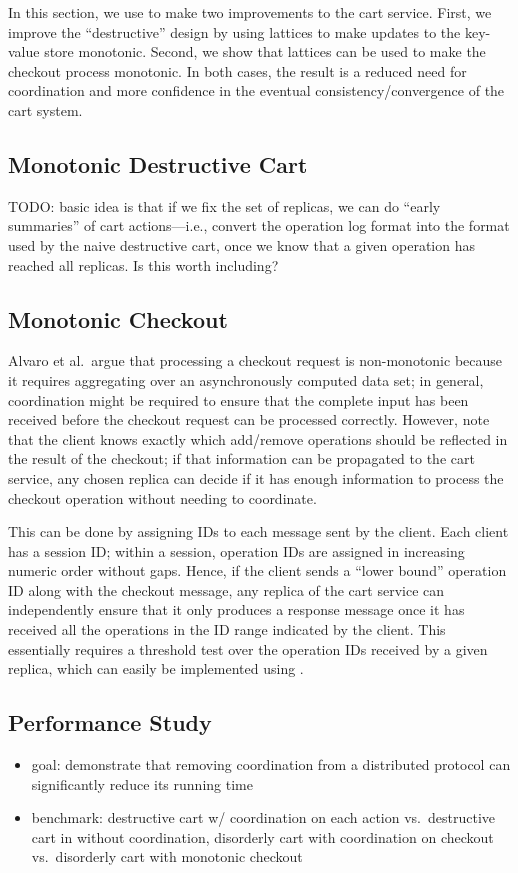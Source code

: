 In this section, we use \lang to make two improvements to the cart
service. First, we improve the ``destructive'' design by using lattices to make
updates to the key-value store monotonic. Second, we show that lattices can be
used to make the checkout process monotonic. In both cases, the result is a
reduced need for coordination and more confidence in the eventual
consistency/convergence of the cart system.

\subsection{Monotonic Destructive Cart}
TODO: basic idea is that if we fix the set of replicas, we can do ``early
summaries'' of cart actions---i.e., convert the operation log format into the
format used by the naive destructive cart, once we know that a given operation
has reached all replicas. Is this worth including?

\subsection{Monotonic Checkout}
Alvaro et al.\ argue that processing a checkout request is non-monotonic because
it requires aggregating over an asynchronously computed data set; in general,
coordination might be required to ensure that the complete input has been
received before the checkout request can be processed correctly. However, note
that the client knows exactly which add/remove operations should be reflected in
the result of the checkout; if that information can be propagated to the cart
service, any chosen replica can decide if it has enough information to process
the checkout operation without needing to coordinate.

This can be done by assigning IDs to each message sent by the client. Each
client has a session ID; within a session, operation IDs are assigned in
increasing numeric order without gaps. Hence, if the client sends a ``lower
bound'' operation ID along with the checkout message, any replica of the cart
service can independently ensure that it only produces a response message once
it has received all the operations in the ID range indicated by the client. This
essentially requires a threshold test over the operation IDs received by a given
replica, which can easily be implemented using \lang.


\subsection{Performance Study}
\begin{itemize}
\item
  goal: demonstrate that removing coordination from a distributed protocol can
  significantly reduce its running time
\item
  benchmark: destructive cart w/ coordination on each action vs.\ destructive
  cart in \lang without coordination, disorderly cart with coordination on
  checkout vs.\ disorderly cart with monotonic checkout
\end{itemize}
